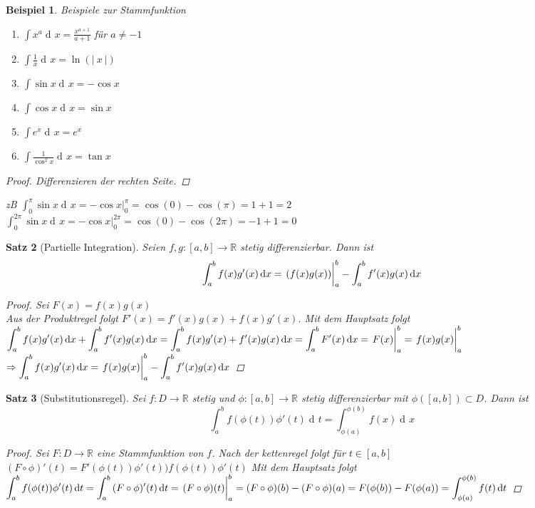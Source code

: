 \documentclass[a4paper,titlepage,oneside]{article}
\def\R{\ensuremath{\mathbb{R}} }
\def\e{\ensuremath{\mathit{e}} }
\newcommand{\der}{\operatorname{d\!}{}}
\newcommand{\abs}[1]{\ensuremath{\left|\:#1\:\right|}}
\newcommand{\integral}[4][x]{\ensuremath{\int_{#2}^{#3}{#4\der #1}}}
\newcommand{\intAB}[2][x]{\integral[#1]{a}{b}{#2}}
\newcommand{\stamm}[3]{\ensuremath{\left.\vphantom{\frac{1}{n}}#3\right|_{#1}^{#2}}}
\theoremstyle{thmstyle}
\newtheorem{satz}{Satz}[section]
\newtheorem{bsp}[satz]{Beispiel}
\theoremstyle{subthmstyle}
\begin{document}
\begin{bsp}
Beispiele zur Stammfunktion
\begin{enumerate}
\item $\displaystyle \int{x^a \der x} = \frac{x^{a+1}}{a+1} $ für $ a \ne -1$
\item $\displaystyle \int{\frac{1}{x} \der x} = \ln(\abs{x})$
\item $\displaystyle \int{\sin x \der x} = - \cos x$
\item $\displaystyle \int{\cos x \der x} = \sin x$
\item $\displaystyle \int{\e^x \der x} =  \e^x$
\item $\displaystyle \int{\frac{1}{\cos^2x} \der x} =  \tan x$
\end{enumerate}
\begin{proof}
Differenzieren der rechten Seite.
\end{proof}
zB $\displaystyle\int_{0}^{\pi}{\sin x \der x} = - \cos x  |_0^{\pi} = \cos(0) - \cos(\pi) = 1 +1 = 2$\\
$\displaystyle\int_{0}^{2\pi}{\sin x \der x} = - \cos x  |_0^{2\pi} = \cos(0) - \cos(2\pi) = -1 +1 = 0$
\end{bsp}

\begin{satz}[Partielle Integration]
Seien $f,g : [a,b] \to \R$ stetig differenzierbar. Dann ist \[\intAB{f(x)g'(x)} = \stamm{a}{b}{(f(x) g(x))} - \intAB{f'(x)g(x)}\]
\begin{proof}
Sei $F(x) = f(x)g(x)$\\
Aus der Produktregel folgt $F'(x) = f'(x) g(x) + f(x) g'(x)$. Mit dem Hauptsatz folgt \\
$\displaystyle \intAB{f(x)g'(x)} + \intAB{f'(x)g(x)} = \intAB{f(x)g'(x) + f'(x)g(x)} = \intAB{F'(x)} = \stamm{a}{b}{F(x)} = \stamm{a}{b}{f(x)g(x)} $\\
$\displaystyle\Rightarrow \intAB{f(x)g'(x)} = \stamm{a}{b}{f(x)g(x)} - \intAB{f'(x)g(x)} $
\end{proof}
\end{satz}

\begin{satz}[Substitutionsregel]
Sei $f : D \to \R$ stetig und $\phi: [a,b] \to \R$ stetig differenzierbar mit $\phi([a,b]) \subset D$. Dann ist \[ \int_{a}^{b}{f(\phi(t))\phi'(t) \der t} = \integral{\phi(a)}{\phi(b)}{f(x)}\]
\begin{proof}
Sei $F: D \to \R$ eine Stammfunktion von $f$. Nach der kettenregel folgt für $t \in [a,b]$ \\
$\displaystyle (F \circ \phi)'(t) = F'(\phi(t))\phi'(t) ) f(\phi(t))\phi'(t)$ Mit dem Hauptsatz folgt \\
$\displaystyle\intAB[t]{f(\phi(t))\phi'(t)} = \intAB[t]{(F\circ\phi)'(t)} = \stamm{a}{b}{(F\circ\phi)(t)} = (F\circ\phi)(b) - (F\circ\phi)(a) = F(\phi(b)) - F(\phi(a)) = \integral[t]{\phi(a)}{\phi(b)}{f(t)}$
\end{proof}
\end{satz}
\end{document}
